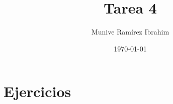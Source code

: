 \documentclass[11pt]{article}
\title{Tarea 4}
\author{Munive Ramírez Ibrahim}
\date{\today}
\begin{document}


\section*{Ejercicios}














% 

% 
\end{document}
